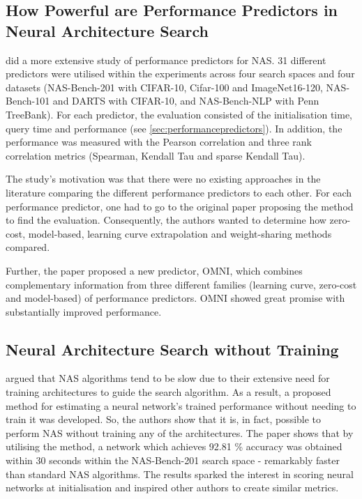 \subsection{How Powerful are Performance Predictors in Neural Architecture Search}

\cite{white2021powerful} did a more extensive study of performance predictors for NAS. 31 different predictors were utilised within the experiments across four search spaces and four datasets (NAS-Bench-201 with CIFAR-10, Cifar-100 and ImageNet16-120, NAS-Bench-101 and DARTS with CIFAR-10, and NAS-Bench-NLP with Penn TreeBank). For each predictor, the evaluation consisted of the initialisation time, query time and performance (see \cref{sec:performancepredictors}). In addition, the performance was measured with the Pearson correlation and three rank correlation metrics (Spearman, Kendall Tau and sparse Kendall Tau). 

The study's motivation was that there were no existing approaches in the literature comparing the different performance predictors to each other. For each performance predictor, one had to go to the original paper proposing the method to find the evaluation. Consequently, the authors wanted to determine how zero-cost, model-based, learning curve extrapolation and weight-sharing methods compared. 

Further, the paper proposed a new predictor, OMNI, which combines complementary information from three different families (learning curve, zero-cost and model-based) of performance predictors. OMNI showed great promise with substantially improved performance. 

\subsection{Neural Architecture Search without Training}
\autocite{jacob_conv} argued that NAS algorithms tend to be slow due to their extensive need for training architectures to guide the search algorithm. As a result, a proposed method for estimating a neural network's trained performance without needing to train it was developed. So, the authors show that it is, in fact, possible to perform NAS without training any of the architectures. The paper shows that by utilising the method, a network which achieves 92.81 \% accuracy was obtained within 30 seconds within the NAS-Bench-201 search space - remarkably faster than standard NAS algorithms. The results sparked the interest in scoring neural networks at initialisation and inspired other authors to create similar metrics. 

